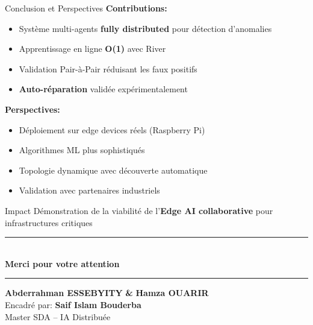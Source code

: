 \documentclass[aspectratio=169]{beamer}
\begin{document}
\begin{frame}{Conclusion et Perspectives}
    \textbf{Contributions:}
    \begin{itemize}
        \item Système multi-agents \textbf{fully distributed} pour détection d'anomalies
        \item Apprentissage en ligne \textbf{O(1)} avec River
        \item Validation Pair-à-Pair réduisant les faux positifs 
        \item \textbf{Auto-réparation} validée expérimentalement
    \end{itemize}
    
    \vspace{0.4cm}
    
    \textbf{Perspectives:}
    \begin{itemize}
        \item Déploiement sur edge devices réels (Raspberry Pi)
        \item Algorithmes ML plus sophistiqués
        \item Topologie dynamique avec découverte automatique
        \item Validation avec partenaires industriels
    \end{itemize}
    
    \vspace{0.2cm}
    
    \begin{block}{Impact}
        Démonstration de la viabilité de l'\textbf{Edge AI collaborative} pour infrastructures critiques
    \end{block}
\end{frame}


{
\begin{frame}[plain]
    \vfill
    \begin{center}
        {\color{accent}\rule{0.4\textwidth}{0.12cm}}\\[0.9cm]
        {\Huge\bfseries\color{primary} Merci pour votre attention}\\[0.6cm]

        {\color{accent}\rule{0.4\textwidth}{0.12cm}}
    \end{center}
    
    \vspace{1.3cm}
    
    \begin{center}
        {\large\textbf{Abderrahman ESSEBYITY} \quad \textbf{\&} \quad \textbf{Hamza OUARIR}}\\[0.35cm]
        {\normalsize Encadré par: \textbf{Saif Islam Bouderba}}\\[0.4cm]
        {\normalsize Master SDA -- IA Distribuée}
    \end{center}
    
    \vfill
\end{frame}
}
\end{document}
